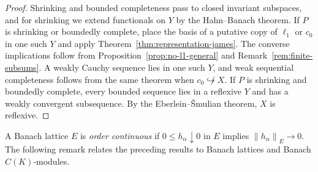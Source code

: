 \documentclass[11pt,leqno]{amsart}
\theoremstyle{compact}
\numberwithin{equation}{section}
\theoremstyle{compactremark}
\theoremstyle{compact}
\newcommand{\1}{\mathbbm{1}}
\newcommand{\norm}[1]{\left\|#1\right\|}
\begin{document}
\begin{proof}
Shrinking and bounded completeness pass to closed invariant subspaces, and for shrinking we extend functionals on $Y$ by the Hahn--Banach theorem. If $P$ is shrinking or boundedly complete, place the basis of a putative copy of $\ell_1$ or $c_0$ in one such $Y$ and apply Theorem~\ref{thm:representation-james}. The converse implications follow from Proposition~\ref{prop:no-l1-general} and Remark~\ref{rem:finite-subsums}. A weakly Cauchy sequence lies in one such $Y$, and weak sequential completeness follows from the same theorem when $c_0\not\hookrightarrow X$. If $P$ is shrinking and boundedly complete, every bounded sequence lies in a reflexive $Y$ and has a weakly convergent subsequence. By the Eberlein--\v Smulian theorem, $X$ is reflexive.
\end{proof}

A Banach lattice $E$ is \emph{order continuous} if $0\leq h_\alpha\downarrow0$ in $E$ implies $\norm{h_\alpha}_E\to0$. The following remark relates the preceding results to Banach lattices and Banach $C(K)$-modules.
\end{document}
